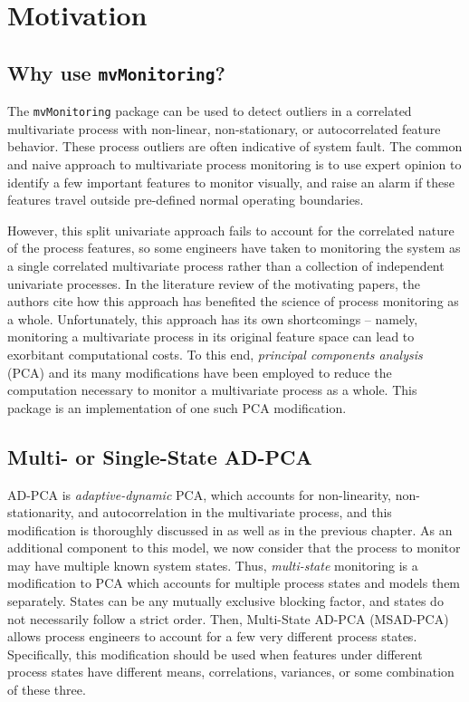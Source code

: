 \documentclass{report}\usepackage[]{graphicx}\usepackage[]{color}
\begin{document}

\section{Motivation} \label{sec:D_Motivation}

\subsection{Why use \texttt{mvMonitoring}?}
The \texttt{mvMonitoring} package can be used to detect outliers in a correlated multivariate process with non-linear, non-stationary, or autocorrelated feature behavior. These process outliers are often indicative of system fault. The common  and naive approach to multivariate process monitoring is to use expert opinion to identify a few important features to monitor visually, and raise an alarm if these features travel outside pre-defined normal operating boundaries.

However, this split univariate approach fails to account for the correlated nature of the process features, so some engineers have taken to monitoring the system as a single correlated multivariate process rather than a collection of independent univariate processes. In the literature review of the motivating papers, the authors cite how this approach has benefited the science of process monitoring as a whole. Unfortunately, this approach has its own shortcomings -- namely, monitoring a multivariate process in its original feature space can lead to exorbitant computational costs. To this end, \emph{principal components analysis} (PCA) and its many modifications have been employed to reduce the computation necessary to monitor a multivariate process as a whole. This package is an implementation of one such PCA modification.


\subsection{Multi- or Single-State AD-PCA}
AD-PCA is \emph{adaptive-dynamic} PCA, which accounts for non-linearity, non-stationarity, and autocorrelation in the multivariate process, and this modification is thoroughly discussed in \cite{kazor_comparison_2016} as well as in the previous chapter. As an additional component to this model, we now consider that the process to monitor may have multiple known system states. Thus, \emph{multi-state} monitoring is a modification to PCA which accounts for multiple process states and models them separately. States can be any mutually exclusive blocking factor, and states do not necessarily follow a strict order. Then, Multi-State AD-PCA (MSAD-PCA) allows process engineers to account for a few very different process states. Specifically, this modification should be used when features under different process states have different means, correlations, variances, or some combination of these three.
\end{document}
